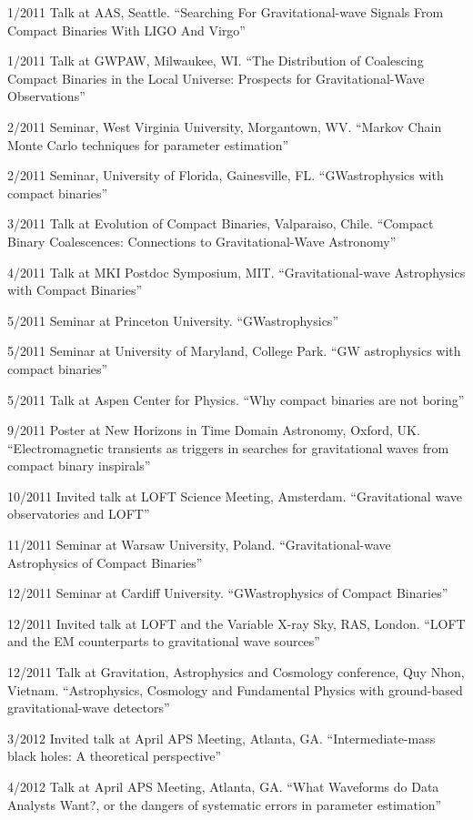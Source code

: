 \documentclass[margin,line]{res}
\begin{document}
\begin{resume}
1/2011 	Talk at AAS, Seattle. 	``Searching For Gravitational-wave Signals From Compact Binaries With LIGO And Virgo''

1/2011 	Talk at GWPAW, Milwaukee, WI.	 ``The Distribution of Coalescing Compact Binaries in the Local Universe: Prospects for Gravitational-Wave Observations''

2/2011 	Seminar, West Virginia University, Morgantown, WV. 	``Markov Chain Monte Carlo techniques for parameter estimation''

2/2011 	Seminar, University of Florida, Gainesville, FL. 	``GWastrophysics with compact binaries''

3/2011 	Talk at Evolution of Compact Binaries, Valparaiso, Chile. 	``Compact Binary Coalescences: Connections to Gravitational-Wave Astronomy'' 

4/2011 	Talk 	at MKI Postdoc Symposium, MIT. 	``Gravitational-wave Astrophysics with Compact Binaries''

5/2011 	Seminar 	at Princeton University.	``GWastrophysics''

5/2011 	Seminar 	at University of Maryland, College Park. 	``GW astrophysics with compact binaries''

5/2011 	Talk 	at Aspen Center for Physics. 	``Why compact binaries are not boring''

9/2011	Poster at New Horizons in Time Domain Astronomy, Oxford, UK.  ``Electromagnetic transients as triggers in searches for gravitational waves from compact binary inspirals''

10/2011	Invited talk at LOFT Science Meeting, Amsterdam. ``Gravitational wave observatories and LOFT''

11/2011	Seminar at Warsaw University, Poland. ``Gravitational-wave Astrophysics of Compact Binaries''

12/2011	Seminar at Cardiff University. 	``GWastrophysics of Compact Binaries''

12/2011	Invited talk at LOFT and the Variable X-ray Sky, RAS, London. ``LOFT and the EM counterparts to gravitational wave sources''

12/2011	Talk at Gravitation, Astrophysics and Cosmology conference, Quy Nhon, Vietnam.  ``Astrophysics, Cosmology and Fundamental Physics with ground-based gravitational-wave detectors''

3/2012 	Invited talk at April APS Meeting, Atlanta, GA. 	``Intermediate-mass black holes: A theoretical perspective''

4/2012 	Talk 	at April APS Meeting, Atlanta, GA.  ``What Waveforms do Data Analysts Want?, or the dangers of systematic errors in parameter estimation''


\end{resume}
\end{document}
